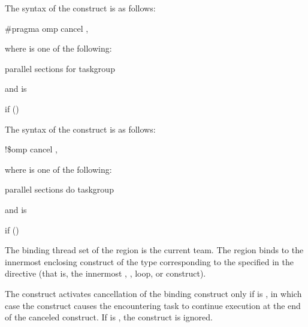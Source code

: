 \syntax
\ccppspecificstart
The syntax of the  construct is as follows:

\begin{boxedcode}
\#pragma omp cancel \plc{construct-type-clause[ [},\plc{] if-clause] new-line}
\end{boxedcode}

\begin{samepage}
where  is one of the following:

\begin{indentedcodelist}
parallel
sections
for
taskgroup
\end{indentedcodelist}
\end{samepage}

and  is
\begin{indentedcodelist}
if ()
\end{indentedcodelist}
\ccppspecificend

\fortranspecificstart
The syntax of the  construct is as follows:

\begin{boxedcode}
!\$omp cancel \plc{construct-type-clause[ [},\plc{] if-clause]}
\end{boxedcode}

\begin{samepage}
where  is one of the following:
\begin{indentedcodelist}
parallel
sections
do
taskgroup
\end{indentedcodelist}
\end{samepage}

and  is

\begin{indentedcodelist}
if ()
\end{indentedcodelist}
\fortranspecificend

\binding
The binding thread set of the  region is the current team. The  region 
binds to the innermost enclosing construct of the type corresponding to the  
specified in the directive (that is, the innermost , , loop, or 
 construct).

\descr
The  construct activates cancellation of the binding construct only if  
is , in which case the construct causes the encountering task to continue execution 
at the end of the canceled construct. If  is , the  construct is 
ignored.

